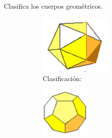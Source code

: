 Clasifica los cuerpos geométricos.
\begin{figure}[H]
    \centering
    \begin{subfigure}{.18\linewidth}
        \centering
        \includegraphics[width=\linewidth]{../images/sinma2_aiu3_ac79_img01}
        \caption{Clasificación:\\\fillin[poliedro][1.6cm]}
        \label{sfig:sinma2_aiu3_ac79_img01}
    \end{subfigure}\qquad
    \begin{subfigure}{.18\linewidth}
        \centering
        \includegraphics[width=\linewidth]{../images/sinma2_aiu3_ac79_img02}

\end{subfigure}
\end{figure}
